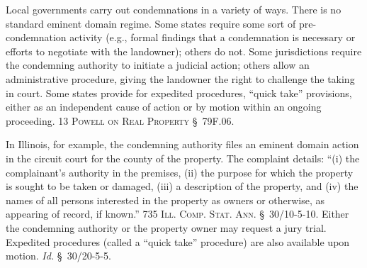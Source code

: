 Local governments carry out condemnations in a variety of ways. There is no
standard eminent domain regime. Some states require some sort of
pre-condemnation activity (e.g., formal findings that a condemnation is
necessary or efforts to negotiate with the landowner); others do not. Some
jurisdictions require the condemning authority to initiate a judicial action;
others allow an administrative procedure, giving the landowner the right to
challenge the taking in court. Some states provide for expedited procedures,
``quick take'' provisions, either as an independent cause of action or by motion
within an ongoing proceeding. 13 \textsc{Powell on Real Property} \S~79F.06.

In Illinois, for example, the condemning authority files an eminent domain
action in the circuit court for the county of the property. The complaint
details: ``(i) the complainant's authority in the premises, (ii) the purpose for
which the property is sought to be taken or damaged, (iii) a description of the
property, and (iv) the names of all persons interested in the property as owners
or otherwise, as appearing of record, if known.'' 735 \textsc{Ill. Comp. Stat.
Ann.} \S~30/10-5-10. Either the condemning authority or the property owner may
request a jury trial. Expedited procedures (called a ``quick take'' procedure)
are also available upon motion. \textit{Id.} \S~30/20-5-5.


